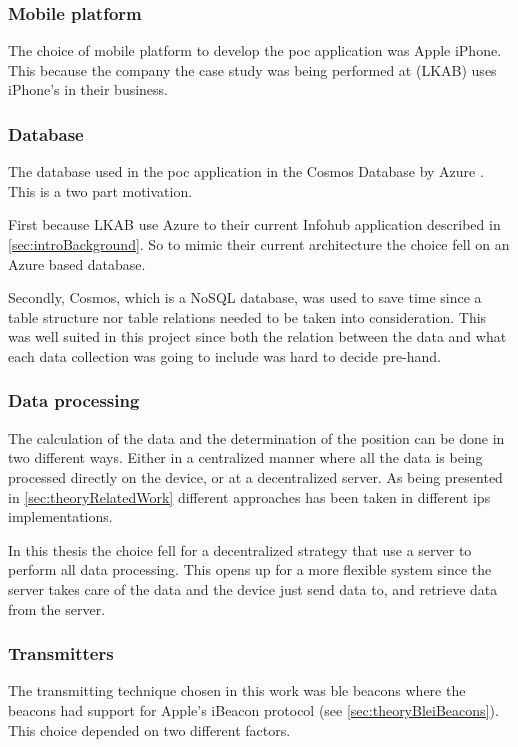 \subsubsection{Mobile platform}\label{sec:methodSoftwareDesignMobilePlatform}
The choice of mobile platform to develop the \acrlong{poc} application was Apple iPhone.
This because the company the case study was being performed at (LKAB) uses iPhone's in their business.


\subsubsection{Database}\label{sec:methodSoftwareDesignDatabase}
The database used in the \acrshort{poc} application in the Cosmos Database by Azure \cite{IntroductionAzureCosmos}.
This is a two part motivation.

\bigskip

First because LKAB use Azure to their current Infohub application described in \cref{sec:introBackground}.
So to mimic their current architecture the choice fell on an Azure based database.

\bigskip

Secondly, Cosmos, which is a NoSQL database, was used to save time since a table structure nor table relations needed to be taken into consideration.
This was well suited in this project since both the relation between the data and what each data collection was going to include was hard to decide pre-hand.


\subsubsection{Data processing}\label{sec:methodSoftwareDesignData}
The calculation of the data and the determination of the position can be done in two different ways.
Either in a centralized manner where all the data is being processed directly on the device, or at a decentralized server.
As being presented in \cref{sec:theoryRelatedWork} different approaches has been taken in different \acrshort{ips} implementations.

\bigskip

In this thesis the choice fell for a decentralized strategy that use a server to perform all data processing.
This opens up for a more flexible system since the server takes care of the data and the device just send data to, and retrieve data from the server.


\subsubsection{Transmitters}\label{sec:methodSoftwareDesignTransmitters}
The transmitting technique chosen in this work was \acrshort{ble} beacons where the beacons had support for Apple's iBeacon protocol (see \cref{sec:theoryBleiBeacons}).
This choice depended on two different factors.

